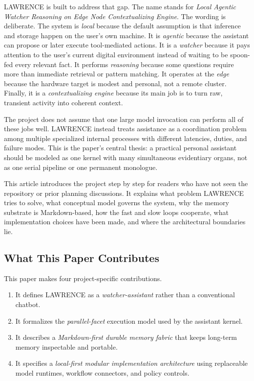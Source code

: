 \documentclass[conference]{IEEEtran}
\begin{document}
LAWRENCE is built to address that gap. The name stands for \emph{Local Agentic Watcher Reasoning on Edge Node Contextualizing Engine}. The wording is deliberate. The system is \emph{local} because the default assumption is that inference and storage happen on the user's own machine. It is \emph{agentic} because the assistant can propose or later execute tool-mediated actions. It is a \emph{watcher} because it pays attention to the user's current digital environment instead of waiting to be spoon-fed every relevant fact. It performs \emph{reasoning} because some questions require more than immediate retrieval or pattern matching. It operates at the \emph{edge} because the hardware target is modest and personal, not a remote cluster. Finally, it is a \emph{contextualizing engine} because its main job is to turn raw, transient activity into coherent context.

The project does not assume that one large model invocation can perform all of these jobs well. LAWRENCE instead treats assistance as a coordination problem among multiple specialized internal processes with different latencies, duties, and failure modes. This is the paper's central thesis: a practical personal assistant should be modeled as one kernel with many simultaneous evidentiary organs, not as one serial pipeline or one permanent monologue.

This article introduces the project step by step for readers who have not seen the repository or prior planning discussions. It explains what problem LAWRENCE tries to solve, what conceptual model governs the system, why the memory substrate is Markdown-based, how the fast and slow loops cooperate, what implementation choices have been made, and where the architectural boundaries lie.

\subsection{What This Paper Contributes}
This paper makes four project-specific contributions.

\begin{enumerate}
\item It defines LAWRENCE as a \emph{watcher-assistant} rather than a conventional chatbot.
\item It formalizes the \emph{parallel-facet} execution model used by the assistant kernel.
\item It describes a \emph{Markdown-first durable memory fabric} that keeps long-term memory inspectable and portable.
\item It specifies a \emph{local-first modular implementation architecture} using replaceable model runtimes, workflow connectors, and policy controls.
\end{enumerate}
\end{document}
